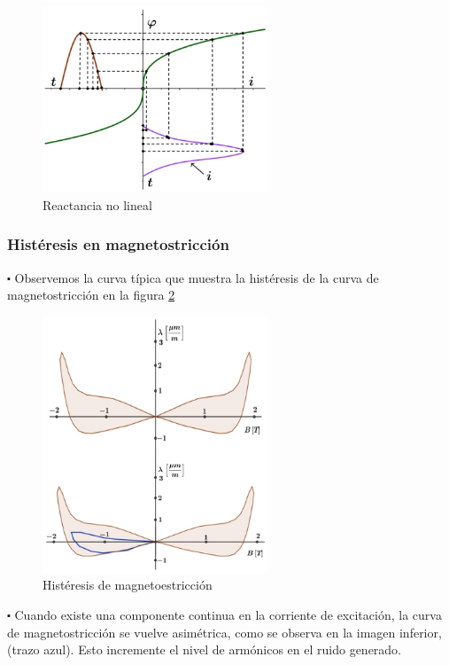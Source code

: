 \begin{figure}[H]
    \centering
    \includegraphics[width=0.6\textwidth]{./Figures/reactNoLineal}
	\caption{Reactancia no lineal}
	\label{fig:reactNoLineal}
\end{figure}


\subsubsection{Histéresis en magnetostricción}

$\centerdot$ Observemos la curva típica que muestra la histéresis de la curva de magnetostricción en la figura \ref{fig:histMagnet} 

\begin{figure}[H]
    \centering
    \includegraphics[width=0.6\textwidth]{./Figures/histMagnet}
	\caption{Histéresis de magnetoestricción}
	\label{fig:histMagnet}
\end{figure}


$\centerdot$ Cuando existe una componente continua en la corriente de excitación, la curva de magnetostricción se vuelve asimétrica, como se observa en la imagen inferior,(trazo azul). Esto incremente el nivel de armónicos en el ruido generado.

